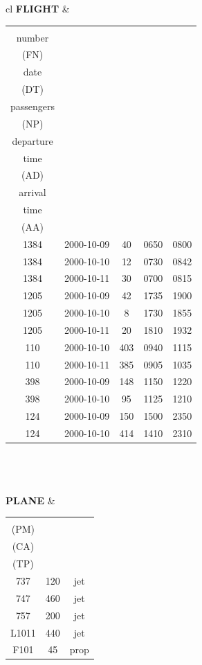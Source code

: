 \documentclass[12pt,a3paper]{article}
\begin{document}
\begin{enumerate}
\begin{center}
\begin{tabular}{cl}
\textbf{FLIGHT} & 
\begin{tabular}{ccccc}
\shortstack{flight \\ number \\ (FN)} & 
\shortstack{ \\ date \\ (DT)} & 
\shortstack{number of \\ passengers \\ (NP)} & 
\shortstack{actual \\ departure \\ time \\ (AD)} & 
\shortstack{actual \\ arrival \\ time \\ (AA)} \\
\hline
1384 & 2000-10-09 & 40 & 0650 & 0800 \\
1384 & 2000-10-10 & 12 & 0730 & 0842 \\
1384 & 2000-10-11 & 30 & 0700 & 0815 \\
1205 & 2000-10-09 & 42 & 1735 & 1900 \\
1205 & 2000-10-10 &  8 & 1730 & 1855 \\
1205 & 2000-10-11 & 20 & 1810 & 1932 \\
 110 & 2000-10-10 & 403 & 0940 & 1115 \\
 110 & 2000-10-11 & 385 & 0905 & 1035 \\
 398 & 2000-10-09 & 148 & 1150 & 1220 \\
 398 & 2000-10-10 & 95 & 1125 & 1210 \\
 124 & 2000-10-09 & 150 & 1500 & 2350 \\
 124 & 2000-10-10 & 414 & 1410 & 2310 \\
\end{tabular} \\
 \\ %
 \\

\textbf{PLANE} & 
\begin{tabular}{ccc}
\shortstack{model \\ (PM)} & 
\shortstack{capacity \\ (CA)} & 
\shortstack{type \\ (TP)} \\
\hline
737 & 120 & jet \\
747 & 460 & jet \\
757 & 200 & jet \\
L1011 & 440 & jet \\
F101 & 45 & prop \\
\end{tabular} \\


\end{tabular}
\end{center}
\end{enumerate}
\end{document}
